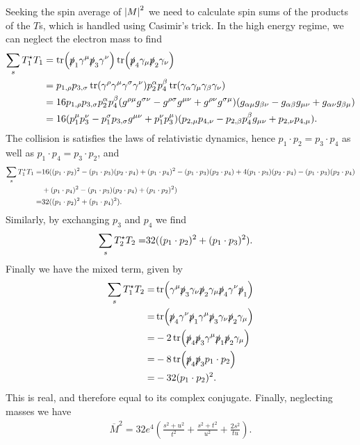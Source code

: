 Seeking the spin average of $\abs{M}^{2}$ we need to calculate spin sums of the products of the $T$s, which is handled using Casimir's trick. In the high energy regime, we can neglect the electron mass to find
\begin{align*}
	\sum\limits_{s}T_{1}^{\star} T_{1} &= \tr(\slashed{p}_{1}\gamma^{\mu}\slashed{p}_{3}\gamma^{\nu})\tr(\slashed{p}_{4}\gamma_{\mu}\slashed{p}_{2}\gamma_{\nu}) \\
	                              &= p_{1, \rho}p_{3, \sigma}\tr(\gamma^{\rho}\gamma^{\mu}\gamma^{\sigma}\gamma^{\nu})p_{2}^{\alpha}p_{4}^{\beta}\tr(\gamma_{\alpha}\gamma_{\mu}\gamma_{\beta}\gamma_{\nu}) \\
	                              &= 16p_{1, \rho}p_{3, \sigma}p_{2}^{\alpha}p_{4}^{\beta}(g^{\rho\mu}g^{\sigma\nu} - g^{\rho\sigma}g^{\mu\nu} + g^{\rho\nu}g^{\sigma\mu})(g_{\alpha\mu}g_{\beta\nu} - g_{\alpha\beta}g_{\mu\nu} + g_{\alpha\nu}g_{\beta\mu}) \\
	                              &= 16(p_{1}^{\mu}p_{3}^{\nu} - p_{1}^{\sigma}p_{3, \sigma}g^{\mu\nu} + p_{1}^{\nu}p_{3}^{\mu})(p_{2, \mu}p_{4, \nu} - p_{2, \beta}p_{4}^{\beta}g_{\mu\nu} + p_{2, \nu}p_{4, \mu}).
\end{align*}
The collision is satisfies the laws of relativistic dynamics, hence $p_{1}\cdot p_{2} = p_{3}\cdot p_{4}$ as well as $p_{1}\cdot p_{4} = p_{3}\cdot p_{2}$, and
\begin{align*}
	\sum\limits_{s}T_{1}^{\star} T_{1} =& 16((p_{1}\cdot p_{2})^{2} - (p_{1}\cdot p_{3})(p_{2}\cdot p_{4}) + (p_{1}\cdot p_{4})^{2} - (p_{1}\cdot p_{3})(p_{2}\cdot p_{4}) + 4(p_{1}\cdot p_{3})(p_{2}\cdot p_{4}) - (p_{1}\cdot p_{3})(p_{2}\cdot p_{4}) \\
	                               &+ (p_{1}\cdot p_{4})^{2} - (p_{1}\cdot p_{3})(p_{2}\cdot p_{4}) + (p_{1}\cdot p_{2})^{2}) \\
	                              =& 32((p_{1}\cdot p_{2})^{2} + (p_{1}\cdot p_{4})^{2}).
\end{align*}
Similarly, by exchanging $p_{3}$ and $p_{4}$ we find
\begin{align*}
	\sum\limits_{s}T_{2}^{\star} T_{2} =& 32((p_{1}\cdot p_{2})^{2} + (p_{1}\cdot p_{3})^{2}).
\end{align*}
Finally we have the mixed term, given by
\begin{align*}
	\sum\limits_{s}T_{1}^{\star} T_{2} =& \tr(\gamma^{\mu}\slashed{p}_{3}\gamma_{\nu}\slashed{p}_{2}\gamma_{\mu}\slashed{p}_{4}\gamma^{\nu}\slashed{p}_{1}) \\
	=& \tr(\slashed{p}_{4}\gamma^{\nu}\slashed{p}_{1}\gamma^{\mu}\slashed{p}_{3}\gamma_{\nu}\slashed{p}_{2}\gamma_{\mu}) \\
	=& -2\tr(\slashed{p}_{4}\slashed{p}_{3}\gamma^{\mu}\slashed{p}_{1}\slashed{p}_{2}\gamma_{\mu}) \\
	=& -8\tr(\slashed{p}_{4}\slashed{p}_{3}p_{1}\cdot p_{2}) \\
	=& -32(p_{1}\cdot p_{2})^{2}.
\end{align*}
This is real, and therefore equal to its complex conjugate. Finally, neglecting masses we have
\begin{align*}
	\overline{M}^{2} = 32e^{4}\left(\frac{s^{2} + u^{2}}{t^{2}} + \frac{s^{2} + t^{2}}{u^{2}} + \frac{2s^{2}}{tu}\right).
\end{align*}

